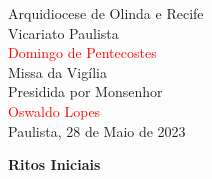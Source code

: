 \documentclass{book}
\begin{document}
\pagestyle{empty}

\begin{center}

    \huge Arquidiocese de Olinda e Recife
    \vspace{.3cm} \\
    \LARGE Vicariato Paulista
    \vspace{3cm} \\
    \textcolor{red}{\Huge Domingo de Pentecostes}
    \vspace{3cm} \\
    \huge Missa da Vigília
    \vspace{.3cm} \\
    \LARGE Presidida por Monsenhor
    \vspace{.3cm} \\
    \textcolor{red}{\Huge Oswaldo Lopes}
    \vspace{\fill}\\
    \LARGE Paulista, 28 de Maio de 2023

\end{center}

\newpage

\begin{center}

    \textbf{Ritos Iniciais}

\end{center}
\end{document}
